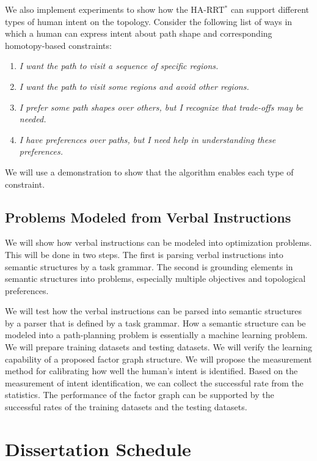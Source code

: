 \documentclass[phd]{byuprop}
\begin{document}
We also implement experiments to show how the HA-RRT$^{*}$ can support different types of human intent on the topology.
Consider the following list of ways in which a human can express intent about path shape and corresponding homotopy-based constraints:
\begin{enumerate}
\item \emph{I want the path to visit a sequence of specific regions.}
\item \emph{I want the path to visit some regions and avoid other regions.}
\item \emph{I prefer some path shapes over others, but I recognize that trade-offs may be needed.} 
\item \emph{I have preferences over paths, but I need help in understanding these preferences.}
\end{enumerate}
We will use a demonstration to show that the algorithm enables each type of constraint.

\subsection{Problems Modeled from Verbal Instructions}
\label{sec:validation:understanding_verbal_command}

We will show how verbal instructions can be modeled into optimization problems.
This will be done in two steps.
The first is parsing verbal instructions into semantic structures by a task grammar.
The second is grounding elements in semantic structures into problems, especially multiple objectives and topological preferences.

We will test how the verbal instructions can be parsed into semantic structures by a parser that is defined by a task grammar.
How a semantic structure can be modeled into a path-planning problem is essentially a machine learning problem.
We will prepare training datasets and testing datasets.
We will verify the learning capability of a proposed factor graph structure.
We will propose the measurement method for calibrating how well the human's intent is identified.
Based on the measurement of intent identification, we can collect the successful rate from the statistics.
The performance of the factor graph can be supported by the successful rates of the training datasets and the testing datasets.


\section{Dissertation Schedule}
\label{sec:dissertation_schedule}
\end{document}
